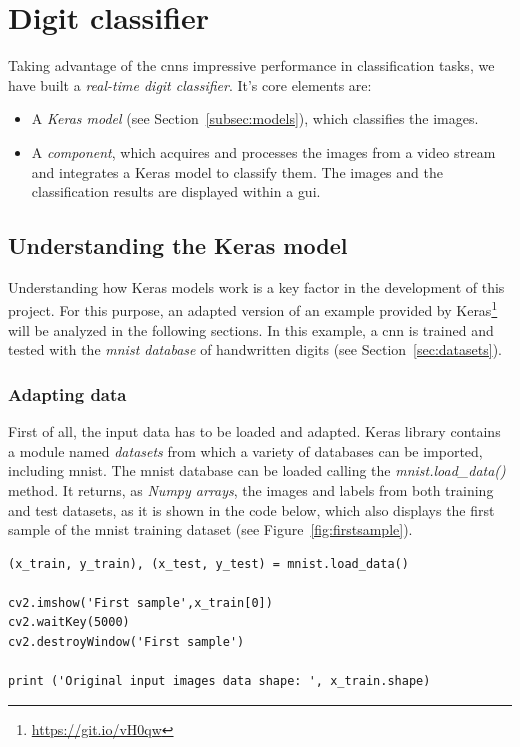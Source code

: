 \chapter{Digit classifier}\label{ch:digitclass}
Taking advantage of the \glspl{cnn} impressive performance in classification tasks, we have built a \emph{real-time digit classifier}. It's core elements are:
\begin{itemize}
	\item A \emph{Keras model} (see Section~\ref{subsec:models}), which classifies the images.
	\item A \emph{component}, which acquires and processes the images from a video stream and integrates a Keras model to classify them. The images and the classification results are displayed within a \gls{gui}.
\end{itemize}

\section{Understanding the Keras model}\label{sec:understanding}
Understanding how Keras models work is a key factor in the development of this project. For this purpose, an adapted version of an example provided by Keras\footnote{\url{https://git.io/vH0qw}} will be analyzed in the following sections. In this example, a \gls{cnn} is trained and tested with the \emph{\gls{mnist} database} of handwritten digits (see Section~\ref{sec:datasets}).

\subsection{Adapting data}\label{subsec:adaptdata}
First of all, the input data has to be loaded and adapted. Keras library contains a module named \textit{datasets} from which a variety of databases can be imported, including \gls{mnist}. The \gls{mnist} database can be loaded calling the \textit{mnist.load\_data()} method. It returns, as \emph{Numpy arrays}, the images and labels from both training and test datasets, as it is shown in the code below, which also displays the first sample of the \gls{mnist} training dataset (see Figure~\ref{fig:firstsample}).
\begin{lstlisting}
(x_train, y_train), (x_test, y_test) = mnist.load_data()

cv2.imshow('First sample',x_train[0])
cv2.waitKey(5000)
cv2.destroyWindow('First sample')

print ('Original input images data shape: ', x_train.shape) 
\end{lstlisting}

